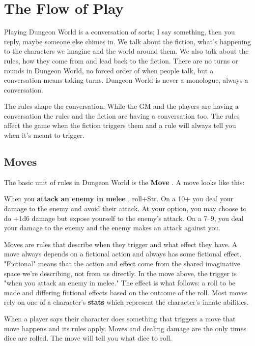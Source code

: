 \chapter{The Flow of Play}
   
       

Playing Dungeon World is a conversation of sorts; I say something, then you reply, maybe someone else chimes in. We talk about the fiction, what's happening to the characters we imagine and the world around them. We also talk about the rules, how they come from and lead back to the fiction. There are no turns or rounds in Dungeon World, no forced order of when people talk, but a conversation means taking turns. Dungeon World is never a monologue, always a conversation.

       

The rules shape the conversation. While the GM and the players are having a conversation the rules and the fiction are having a conversation too. The rules affect the game when the fiction triggers them and a rule will always tell you when it's meant to trigger.

       
\section{Moves}   
       

The basic unit of rules in Dungeon World is the {\bf Move} . A move looks like this:

       
\startExample
When you {\bf attack an enemy in melee} , roll+Str. On a 10+ you deal your damage to the enemy and avoid their attack. At your option, you may choose to do +1d6 damage but expose yourself to the enemy's attack. On a 7–9, you deal your damage to the enemy and the enemy makes an attack against you.
\stopExample
       

Moves are rules that describe when they trigger and what effect they have. A move always depends on a fictional action and always has some fictional effect. "Fictional" means that the action and effect come from the shared imaginative space we're describing, not from us directly. In the move above, the trigger is "when you attack an enemy in melee." The effect is what follows: a roll to be made and differing fictional effects based on the outcome of the roll. Most moves rely on one of a character's {\bf stats}  which represent the character's innate abilities.

       

When a player says their character does something that triggers a move that move happens and its rules apply. Moves and dealing damage are the only times dice are rolled. The move will tell you what dice to roll.

